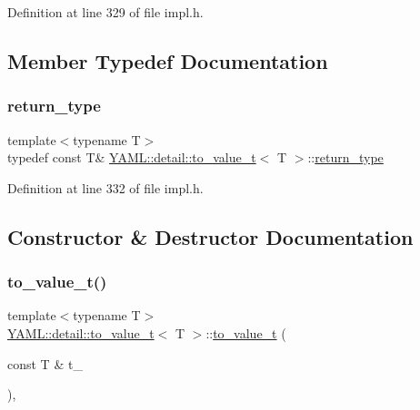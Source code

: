 Definition at line 329 of file impl.\+h.



\subsection{Member Typedef Documentation}
\mbox{\label{struct_y_a_m_l_1_1detail_1_1to__value__t_a1544f408af56e9ddc3b9f5e1b249fe00}} 
\subsubsection{\texorpdfstring{return\_type}{return\_type}}
{\footnotesize\ttfamily template$<$typename T$>$ \\
typedef const T\& \mbox{\hyperlink{struct_y_a_m_l_1_1detail_1_1to__value__t}{Y\+A\+M\+L\+::detail\+::to\+\_\+value\+\_\+t}}$<$ T $>$\+::\mbox{\hyperlink{struct_y_a_m_l_1_1detail_1_1to__value__t_a1544f408af56e9ddc3b9f5e1b249fe00}{return\+\_\+type}}}



Definition at line 332 of file impl.\+h.



\subsection{Constructor \& Destructor Documentation}
\mbox{\label{struct_y_a_m_l_1_1detail_1_1to__value__t_ada645757dab7cb3fc901e6edb6b13bd4}} 
\subsubsection{\texorpdfstring{to\_value\_t()}{to\_value\_t()}}
{\footnotesize\ttfamily template$<$typename T$>$ \\
\mbox{\hyperlink{struct_y_a_m_l_1_1detail_1_1to__value__t}{Y\+A\+M\+L\+::detail\+::to\+\_\+value\+\_\+t}}$<$ T $>$\+::\mbox{\hyperlink{struct_y_a_m_l_1_1detail_1_1to__value__t}{to\+\_\+value\+\_\+t}} (\begin{DoxyParamCaption}\item[{const T \&}]{t\+\_\+ }\end{DoxyParamCaption})\hspace{0.3cm}{\ttfamily [inline]}, {\ttfamily [explicit]}}



